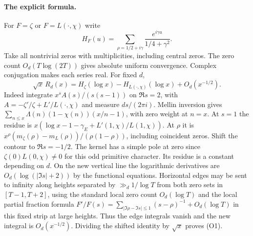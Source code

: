 \paragraph{The explicit formula.}
For $F=\zeta$ or $F=L(\cdot,\chi)$ write
\[
 H_F(u)=\sum_{\rho=1/2+i\gamma}
          \frac{e^{i\gamma u}}{1/4+\gamma^2}.
\]
Take all nontrivial zeros with multiplicities, including central zeros.
The zero count $O_d(T\log(2T))$ gives absolute uniform convergence.
Complex conjugation makes each series real. For fixed $d$,
\[
 \sqrt x\,R_d(x)=H_\zeta(\log x)-H_{L(\cdot,\chi)}(\log x)
                         +O_d(x^{-1/2}).                         \tag{O1}
\]
Indeed integrate $x^s A(s)/(s(s-1))$ on $\Re s=2$, with
$A=-\zeta'/\zeta+L'/L(\cdot,\chi)$ and measure $ds/(2\pi i)$.
Mellin inversion gives $\sum_{n\le x}\Lambda(n)(1-\chi(n))(x/n-1)$,
with zero weight at $n=x$. At $s=1$ the residue is
$x(\log x-1-\gamma_E+L'(1,\chi)/L(1,\chi))$. At $\rho$ it is
$x^\rho(m_\zeta(\rho)-m_L(\rho))/(\rho(1-\rho))$, including
coincident zeros. Shift the contour to $\Re s=-1/2$. The kernel
has a simple pole at zero since $\zeta(0)L(0,\chi)\ne0$ for this odd
primitive character. Its residue is a constant depending on $d$.
On the new vertical line the logarithmic derivatives are
$O_d(\log(|\Im s|+2))$ by the functional equations.
Horizontal edges may be sent to infinity along heights separated by
$\gg_d 1/\log T$ from both zero sets in $[T-1,T+2]$, using the
standard local zero count $O_d(\log T)$ and the local partial fraction
formula $F'/F(s)=\sum_{|\Im\rho-\Im s|\le1}(s-\rho)^{-1}
+O_d(\log T)$ in this fixed strip at large heights. Thus the edge
integrals vanish and the new integral is $O_d(x^{-1/2})$. Dividing
the shifted identity by $\sqrt x$ proves (O1).

